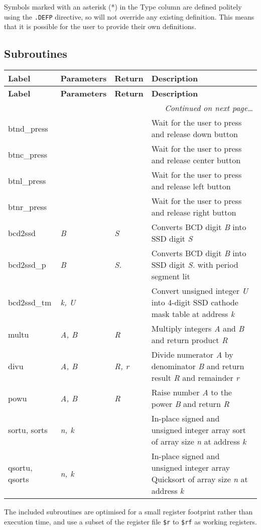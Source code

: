 \documentclass[12pt,twoside]{report}
\begin{document}
Symbols marked with an asterisk (*) in the Type column are defined
politely using the \texttt{.DEFP} directive, so will not override any
existing definition. This means that it is possible for the user to
provide their own definitions.

\subsection{Subroutines}

{\scriptsize
\begin{longtable}{ | l | l | l | l | }
  \hline
  \textbf{Label} & \textbf{Parameters} & \textbf{Return} & \textbf{Description} \\
  \hline
\endfirsthead
  \hline
  \textbf{Label} & \textbf{Parameters} & \textbf{Return} & \textbf{Description} \\
  \hline

\endhead
  \hline
  \multicolumn{4}{r}{\emph{Continued on next page\ldots}}
\endfoot

\endlastfoot
 \hline
 btnu\_press & & & Wait for the user to press and release up button \\
 btnd\_press & & & Wait for the user to press and release down button \\
 btnc\_press & & & Wait for the user to press and release center button \\
 btnl\_press & & & Wait for the user to press and release left button \\
 btnr\_press & & & Wait for the user to press and release right button \\
 bcd2ssd & \textit{B} & \textit{S} & Converts BCD digit \textit{B} into SSD digit \textit{S} \\
 bcd2ssd\_p & \textit{B} & \textit{S.} & Converts BCD digit \textit{B} into SSD digit \textit{S.} with period segment lit \\
 bcd2ssd\_tm & \textit{k, U} & & Convert unsigned integer \textit{U} into 4-digit SSD cathode mask table at address \textit{k} \\
 multu & \textit{A, B} & \textit{R} & Multiply integers \textit{A} and \textit{B} and return product \textit{R} \\
 divu & \textit{A, B} & \textit{R, r} & Divide numerator \textit{A} by denominator \textit{B} and return result \textit{R} and remainder \textit{r} \\
 powu & \textit{A, B} & \textit{R} & Raise number \textit{A} to the power \textit{B} and return \textit{R} \\
 sortu, sorts & \textit{n, k} & & In-place signed and unsigned integer array sort of array size \textit{n} at address \textit{k} \\
 qsortu, qsorts & \textit{n, k} & & In-place signed and unsigned integer array Quicksort of array size \textit{n} at address \textit{k} \\
 \hline
\end{longtable}}

The included subroutines are optimised for a small register footprint
rather than execution time, and use a subset of the register file
\texttt{\$r} to \texttt{\$rf} as working registers.
\end{document}
